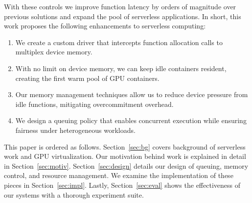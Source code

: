 With these controls we improve function latency by orders of magnitude over previous solutions and expand the pool of serverless applications.
In short, this work proposes the following enhancements to serverless computing:
\begin{enumerate}[leftmargin=*]
  \item We create a custom driver that intercepts function allocation calls to multiplex device memory.
  \item With no limit on device memory, we can keep idle containers resident, creating the first warm pool of GPU containers.
  \item Our memory management techniques allow us to reduce device pressure from idle functions, mitigating overcommitment overhead.
  \item We design a queuing policy that enables concurrent execution while ensuring fairness under heterogeneous workloads.
\end{enumerate}

This paper is ordered as follows.
Section~\ref{sec:bg} covers background of serverless work and GPU virtualization.
Our motivation behind work is explained in detail in Section~\ref{sec:motiv}.
Section~\ref{sec:design} details our design of queuing, memory control, and resource management.
We examine the implementation of these pieces in Section~\ref{sec:impl}.
Lastly, Section~\ref{sec:eval} shows the effectiveness of our systems with a thorough experiment suite.
